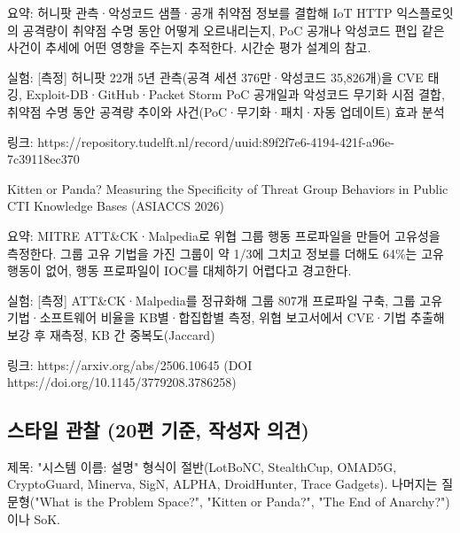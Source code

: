 \par\noindent \textbullet\enspace 요약: 허니팟 관측·악성코드 샘플·공개 취약점 정보를 결합해 IoT HTTP 익스플로잇의 공격량이 취약점 수명 동안 어떻게 오르내리는지, PoC 공개나 악성코드 편입 같은 사건이 추세에 어떤 영향을 주는지 추적한다. 시간순 평가 설계의 참고.


\par\noindent \textbullet\enspace 실험: [측정] 허니팟 22개 5년 관측(공격 세션 376만·악성코드 35,826개)을 CVE 태깅, Exploit-DB·GitHub·Packet Storm PoC 공개일과 악성코드 무기화 시점 결합, 취약점 수명 동안 공격량 추이와 사건(PoC·무기화·패치·자동 업데이트) 효과 분석


\par\noindent \textbullet\enspace 링크: https:/\allowbreak{}/\allowbreak{}repository.tudelft.nl/\allowbreak{}record/\allowbreak{}uuid:89f2f7e6-4194-421f-a96e-7c39118ec370



\par\noindent \textbullet\enspace Kitten or Panda? Measuring the Specificity of Threat Group Behaviors in Public CTI Knowledge Bases (ASIACCS 2026)

\par\noindent \textbullet\enspace 요약: MITRE ATT\&CK·Malpedia로 위협 그룹 행동 프로파일을 만들어 고유성을 측정한다. 그룹 고유 기법을 가진 그룹이 약 1/\allowbreak{}3에 그치고 정보를 더해도 64\%는 고유 행동이 없어, 행동 프로파일이 IOC를 대체하기 어렵다고 경고한다.


\par\noindent \textbullet\enspace 실험: [측정] ATT\&CK·Malpedia를 정규화해 그룹 807개 프로파일 구축, 그룹 고유 기법·소프트웨어 비율을 KB별·합집합별 측정, 위협 보고서에서 CVE·기법 추출해 보강 후 재측정, KB 간 중복도(Jaccard)


\par\noindent \textbullet\enspace 링크: https:/\allowbreak{}/\allowbreak{}arxiv.org/\allowbreak{}abs/\allowbreak{}2506.10645 (DOI https:/\allowbreak{}/\allowbreak{}doi.org/\allowbreak{}10.1145/\allowbreak{}3779208.3786258)



\subsection{스타일 관찰 (20편 기준, 작성자 의견)}
\par\noindent \textbullet\enspace 제목: "시스템 이름: 설명" 형식이 절반(LotBoNC, StealthCup, OMAD5G, CryptoGuard, Minerva, SigN, ALPHA, DroidHunter, Trace Gadgets). 나머지는 질문형("What is the Problem Space?", "Kitten or Panda?", "The End of Anarchy?")이나 SoK.


